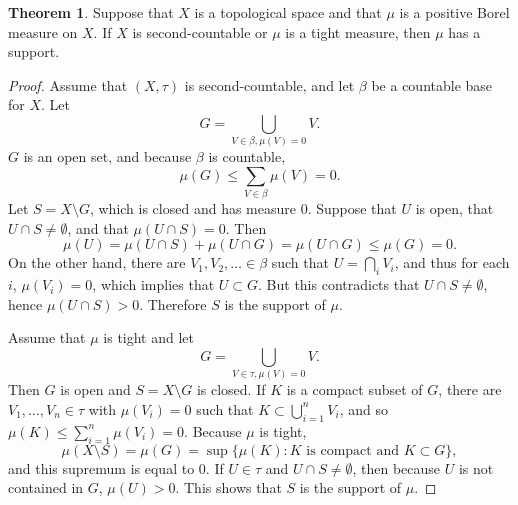 \documentclass{article}
\theoremstyle{definition}
\newtheorem{theorem}{Theorem}
\theoremstyle{definition}
\begin{document}
\begin{theorem}
Suppose that $X$ is a topological space and that $\mu$ is a positive Borel measure on $X$. If
$X$ is second-countable or $\mu$ is a tight measure, then $\mu$ has a support.
\end{theorem}
\begin{proof}
Assume that $(X,\tau)$ is second-countable, and let
$\beta$ be a countable base for $X$. Let
\[
G = \bigcup_{V \in \beta, \mu(V)=0} V.
\]
$G$ is an open set, and
because $\beta$ is countable, 
\[
\mu(G) \leq \sum_{V \in \beta} \mu(V) = 0.
\]
Let $S = X \setminus G$, which is closed and has measure $0$.
Suppose that $U$ is open, that $U \cap S \neq \emptyset$, and  that
$\mu(U \cap S)=0$. Then 
\[
\mu(U) = \mu(U \cap S) + \mu(U \cap G)  = \mu(U \cap G) \leq \mu(G) = 0.
\]
On the other hand, there are $V_1,V_2,\ldots \in \beta$ such that $U = \bigcap_i V_i$, and thus for each $i$,
$\mu(V_i)=0$, which implies that $U \subset G$. But this contradicts that $U \cap S \neq \emptyset$, hence
$\mu(U \cap S)>0$. Therefore $S$ is the support of $\mu$.

Assume that $\mu$ is tight and let
\[
G = \bigcup_{V \in \tau, \mu(V) = 0} V.
\]
Then $G$ is open and $S = X \setminus G$ is closed. If $K$ is a compact subset of $G$, 
there are $V_1,\ldots,V_n \in \tau$ with $\mu(V_i)=0$ such that
$K \subset \bigcup_{i=1}^n V_i$, and so
$\mu(K) \leq \sum_{i=1}^n \mu(V_i) = 0$. Because $\mu$ is tight,
\[
\mu(X \setminus S) = \mu(G) = \sup \{\mu(K): \textrm{$K$ is compact and $K \subset G$}\},
\]
and this supremum is equal to $0$. If $U \in \tau$ and $U \cap S \neq \emptyset$, then because
$U$ is not contained in $G$, $\mu(U)>0$. This shows that $S$ is the support of $\mu$.
\end{proof}
\end{document}
